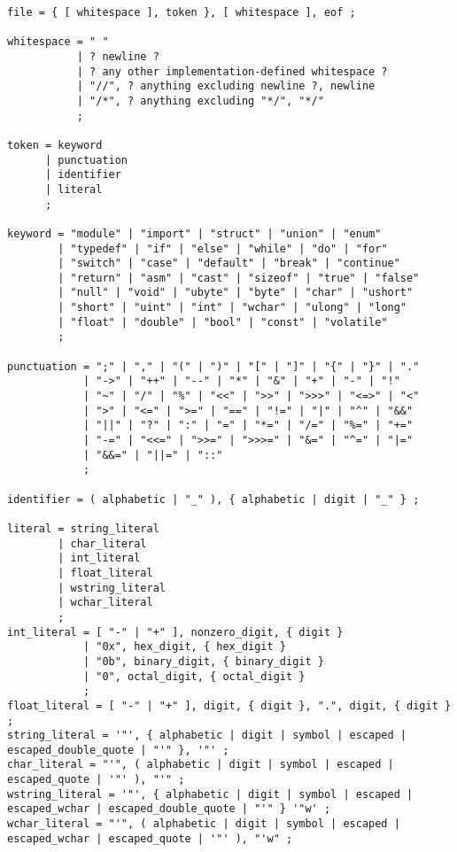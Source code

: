 \documentclass[letterpaper,12pt]{book}
\begin{document}
\begin{lstlisting}[breaklines=true]
file = { [ whitespace ], token }, [ whitespace ], eof ;

whitespace = " "
           | ? newline ?
           | ? any other implementation-defined whitespace ?
           | "//", ? anything excluding newline ?, newline
           | "/*", ? anything excluding "*/", "*/"
           ;

token = keyword
      | punctuation
      | identifier
      | literal
      ;

keyword = "module" | "import" | "struct" | "union" | "enum"
        | "typedef" | "if" | "else" | "while" | "do" | "for"
        | "switch" | "case" | "default" | "break" | "continue"
        | "return" | "asm" | "cast" | "sizeof" | "true" | "false"
        | "null" | "void" | "ubyte" | "byte" | "char" | "ushort"
        | "short" | "uint" | "int" | "wchar" | "ulong" | "long"
        | "float" | "double" | "bool" | "const" | "volatile"
        ;

punctuation = ";" | "," | "(" | ")" | "[" | "]" | "{" | "}" | "."
            | "->" | "++" | "--" | "*" | "&" | "+" | "-" | "!"
            | "~" | "/" | "%" | "<<" | ">>" | ">>>" | "<=>" | "<"
            | ">" | "<=" | ">=" | "==" | "!=" | "|" | "^" | "&&"
            | "||" | "?" | ":" | "=" | "*=" | "/=" | "%=" | "+="
            | "-=" | "<<=" | ">>=" | ">>>=" | "&=" | "^=" | "|="
            | "&&=" | "||=" | "::"
            ;

identifier = ( alphabetic | "_" ), { alphabetic | digit | "_" } ;

literal = string_literal
        | char_literal
        | int_literal
        | float_literal
        | wstring_literal
        | wchar_literal
        ;
int_literal = [ "-" | "+" ], nonzero_digit, { digit }
            | "0x", hex_digit, { hex_digit }
            | "0b", binary_digit, { binary_digit }
            | "0", octal_digit, { octal_digit }
            ;
float_literal = [ "-" | "+" ], digit, { digit }, ".", digit, { digit } ;
string_literal = '"', { alphabetic | digit | symbol | escaped | escaped_double_quote | "'" }, '"' ;
char_literal = "'", ( alphabetic | digit | symbol | escaped | escaped_quote | '"' ), "'" ;
wstring_literal = '"', { alphabetic | digit | symbol | escaped | escaped_wchar | escaped_double_quote | "'" } '"w' ;
wchar_literal = "'", ( alphabetic | digit | symbol | escaped | escaped_wchar | escaped_quote | '"' ), "'w" ;


\end{lstlisting}
\end{document}
